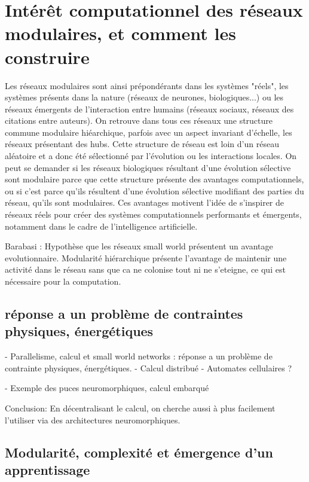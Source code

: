 \section{Intérêt computationnel des réseaux modulaires, et comment les construire}

Les réseaux modulaires sont ainsi prépondérants dans les systèmes "réels", les systèmes présents dans la nature (réseaux de neurones, biologiques...) ou les réseaux émergents de l'interaction entre humains (réseaux sociaux, réseaux des citations entre auteurs). On retrouve dans tous ces réseaux une structure commune modulaire hiéarchique, parfois avec un aspect invariant d'échelle, les réseaux présentant des hubs. Cette structure de réseau est loin d'un réseau aléatoire et a donc été sélectionné par l'évolution ou les interactions locales. On peut se demander si les réseaux biologiques résultant d'une évolution sélective sont modulaire parce que cette structure présente des avantages computationnels, ou si c'est parce qu'ils résultent d'une évolution sélective modifiant des parties du réseau, qu'ils sont modulaires. 
Ces avantages motivent l'idée de s'inspirer de réseaux réels pour créer des systèmes computationnels performants et émergents, notamment dans le cadre de l'intelligence artificielle. 

Barabasi : Hypothèse que les réseaux small world présentent un avantage evolutionnaire.
Modularité hiérarchique présente l'avantage de maintenir une activité dans le réseau sans que ca ne colonise tout ni ne s'eteigne, ce qui est nécessaire pour la computation. 



\subsection{réponse a un problème de contraintes physiques, énergétiques}


- Parallelisme, calcul et small world networks : réponse a un problème de contrainte physiques, énergétiques. 
- Calcul distribué 
- Automates cellulaires ?

- Exemple des puces neuromorphiques, calcul embarqué


Conclusion: En décentralisant le calcul, on cherche aussi à plus facilement l'utiliser via des architectures neuromorphiques. 

\subsection{Modularité, complexité et émergence d'un apprentissage }



